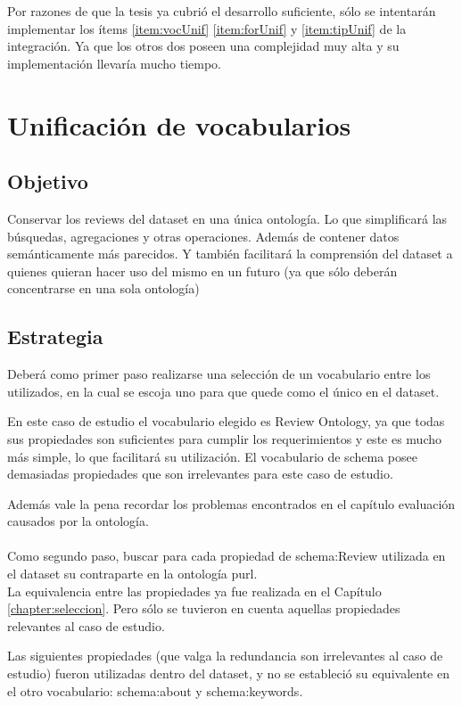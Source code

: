\noindent Por razones de que la tesis ya cubrió el desarrollo suficiente, sólo se intentarán implementar los ítems \ref{item:vocUnif} \ref{item:forUnif} y \ref{item:tipUnif} de la integración. Ya que 
los otros dos poseen una complejidad muy alta y su implementación llevaría mucho tiempo.\\

\section{Unificación de vocabularios}
\label{section:unificacion-vocabularios}

\subsection*{Objetivo} Conservar los reviews del dataset en una única ontología. Lo que simplificará las búsquedas, agregaciones y otras operaciones.
Además de contener datos semánticamente más parecidos. Y también facilitará la comprensión del dataset a quienes quieran hacer uso del mismo
en un futuro (ya que sólo deberán concentrarse en una sola ontología)

\subsection*{Estrategia} Deberá como primer paso realizarse una selección de un vocabulario entre los utilizados, en la cual se escoja uno para que quede como el único en el dataset.

En este caso de estudio el vocabulario elegido es Review Ontology, ya que todas sus propiedades son suficientes para cumplir los requerimientos y 
este es mucho más simple, lo que facilitará su utilización. El vocabulario de schema posee demasiadas propiedades que son irrelevantes para este caso de estudio. 

Además vale la pena recordar los problemas encontrados en el capítulo evaluación causados por la ontología.
\\\\Como segundo paso, buscar para cada propiedad de schema:Review utilizada en el dataset su contraparte en la ontología purl.\\
La equivalencia entre las propiedades ya fue realizada en el Capítulo \ref{chapter:seleccion}. Pero sólo se tuvieron en cuenta aquellas propiedades 
relevantes al caso de estudio.

Las siguientes propiedades (que valga la redundancia son irrelevantes al caso de estudio) fueron utilizadas dentro del dataset, y 
no se estableció su equivalente en el otro vocabulario: schema:about y schema:keywords. 

